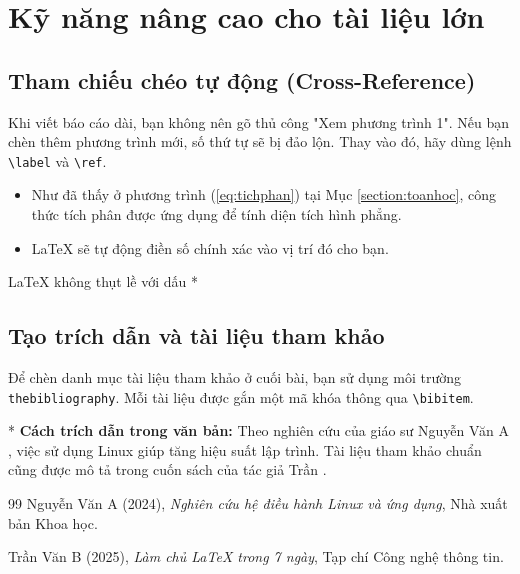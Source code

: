 \documentclass{article}
\begin{document}
\section{Kỹ năng nâng cao cho tài liệu lớn}

\subsection{Tham chiếu chéo tự động (Cross-Reference)}
Khi viết báo cáo dài, bạn không nên gõ thủ công "Xem phương trình 1". 
Nếu bạn chèn thêm phương trình mới, số thứ tự sẽ bị đảo lộn. 
Thay vào đó, hãy dùng lệnh \texttt{\textbackslash label} và \texttt{\textbackslash ref}.

\begin{itemize}
    \item Như đã thấy ở phương trình (\ref{eq:tichphan}) 
tại Mục \ref{section:toanhoc}, công thức tích phân được ứng dụng để tính diện tích hình phẳng.
    \item LaTeX sẽ tự động điền số chính xác vào vị trí đó cho bạn.
\end{itemize}

\noindent * LaTeX không thụt lề với dấu *

\subsection{Tạo trích dẫn và tài liệu tham khảo}
Để chèn danh mục tài liệu tham khảo ở cuối bài, bạn sử dụng môi trường \texttt{thebibliography}. 
Mỗi tài liệu được gắn một mã khóa thông qua \texttt{\textbackslash bibitem}.

* \textbf{Cách trích dẫn trong văn bản:} Theo nghiên cứu của giáo sư Nguyễn Văn A \cite{nguyen2024}, 
việc sử dụng Linux giúp tăng hiệu suất lập trình. 
Tài liệu tham khảo chuẩn cũng được mô tả trong cuốn sách của tác giả Trần \cite{tran2025}.

\newpage %

\begin{thebibliography}{99}
    Nguyễn Văn A (2024), \textit{Nghiên cứu hệ điều hành Linux và ứng dụng}, Nhà xuất bản Khoa học.

    Trần Văn B (2025), \textit{Làm chủ LaTeX trong 7 ngày}, Tạp chí Công nghệ thông tin.
\end{thebibliography}
\end{document}

